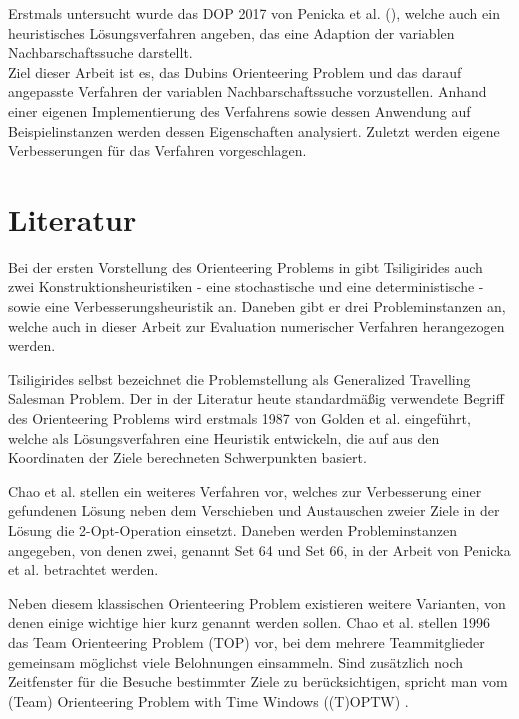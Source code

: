\documentclass[12pt,a4paper,twoside]{article}
\theoremstyle{definition}
\numberwithin{equation}{section}
\begin{document}
Erstmals untersucht wurde das DOP 2017 von Penicka et al. (\cite{R.Penicka.2017}), welche auch ein heuristisches Lösungsverfahren angeben, das eine Adaption der variablen Nachbarschaftssuche darstellt.\\

Ziel dieser Arbeit ist es, das Dubins Orienteering Problem und das darauf angepasste Verfahren der variablen Nachbarschaftssuche vorzustellen. Anhand einer eigenen Implementierung des Verfahrens sowie dessen Anwendung auf Beispielinstanzen werden dessen Eigenschaften analysiert. Zuletzt werden eigene Verbesserungen für das Verfahren vorgeschlagen.


\newpage
\section{Literatur}\label{section:literature}
Bei der ersten Vorstellung des Orienteering Problems in \cite{Tsiligirides.1984} gibt Tsiligirides auch zwei Konstruktionsheuristiken - eine stochastische und eine deterministische - sowie eine Verbesserungsheuristik an. Daneben gibt er drei Probleminstanzen an, welche auch in dieser Arbeit zur Evaluation numerischer Verfahren herangezogen werden.

Tsiligirides selbst bezeichnet die Problemstellung als Generalized Travelling Salesman Problem. Der in der Literatur heute standardmäßig verwendete Begriff des Orienteering Problems wird erstmals 1987 von Golden et al. \cite{Golden.1987} eingeführt, welche als Lösungsverfahren eine Heuristik entwickeln, die auf aus den Koordinaten der Ziele berechneten Schwerpunkten basiert.

Chao et al. \cite{Chao.1996b} stellen ein weiteres Verfahren vor, welches zur Verbesserung einer gefundenen Lösung neben dem Verschieben und Austauschen zweier Ziele in der Lösung die 2-Opt-Operation einsetzt. Daneben werden Probleminstanzen angegeben, von denen zwei, genannt Set 64 und Set 66, in der Arbeit von Penicka et al. \cite{R.Penicka.2017} betrachtet werden.

Neben diesem klassischen Orienteering Problem existieren weitere Varianten, von denen einige wichtige hier kurz genannt werden sollen. Chao et al. \cite{Chao.1996} stellen 1996 das Team Orienteering Problem (TOP) vor, bei dem mehrere Teammitglieder gemeinsam möglichst viele Belohnungen einsammeln. Sind zusätzlich noch Zeitfenster für die Besuche bestimmter Ziele zu berücksichtigen, spricht man vom (Team) Orienteering Problem with Time Windows ((T)OPTW) \cite{Vansteenwegen.2019}.
\end{document}
